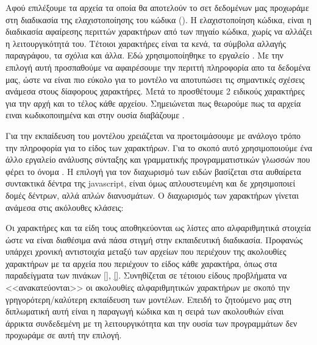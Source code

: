 Αφού επιλέξουμε τα αρχεία τα οποία θα αποτελούν το σετ δεδομένων μας προχωράμε στη διαδικασία της ελαχιστοποίησης του κώδικα ().
Η ελαχιστοποίηση κώδικα, είναι η διαδικασία αφαίρεσης περιττών χαρακτήρων από των πηγαίο κώδικα, χωρίς να αλλάζει η λειτουργικότητά του. Τέτοιοι χαρακτήρες είναι τα κενά, τα σύμβολα αλλαγής παραγράφου, τα σχόλια και άλλα. Εδώ χρησιμοποίηθηκε το εργαλείο .
Με την επιλογή αυτή προσπαθούμε να αφαιρέσουμε την περιττή πληροφορία απο τα δεδομένα μας, ώστε να είναι πιο εύκολο για το μοντέλο να αποτυπώσει τις σημαντικές σχέσεις ανάμεσα στους δίαφορους χαρακτήρες.
Μετά το  προσθέτουμε 2 ειδικούς χαρακτήρες για την αρχή και το τέλος κάθε αρχείου. Σημειώνεται πως θεωρούμε πως τα αρχεία ειναι  κωδικοποιημένα και στην ουσία διαβάζουμε . 

Για την εκπαίδευση του μοντέλου  χρειάζεται να προετοιμάσουμε με ανάλογο τρόπο την πληροφορία για το είδος των χαρακτήρων. Για το σκοπό αυτό χρησιμοποιούμε ένα άλλο εργαλείο ανάλυσης σύνταξης και γραμματικής προγραμματιστικών γλωσσών που φέρει το όνομα .
Η επιλογή για τον διαχωρισμό των ειδών βασίζεται στα αυθαίρετα συντακτικά δέντρα  της javascript, είναι όμως απλουστευμένη και δε χρησιμοποιεί δομές δέντρων, αλλά απλών διανυσμάτων.
Ο διαχωρισμός των χαρακτήρων γίνεται ανάμεσα στις ακόλουθες κλάσεις: 

Οι χαρακτήρες και τα είδη τους αποθηκεύονται ως λίστες απο αλφαριθμητικά στοιχεία ώστε να είναι διαθέσιμα ανά πάσα στιγμή στην εκπαιδευτική διαδικασία.
Προφανώς υπάρχει χρονική αντιστοιχία μεταξύ των αρχείων που περιέχουν της ακολουθίες χαρακτήρων με τα αρχεία που περιέχουν το είδος κάθε χαρακτήρα, όπως στα παραδείγματα των πινάκων \ref{}, \ref{}. %
Συνηθίζεται σε τέτοιου είδους προβλήματα να <<ανακατεύονται>> οι ακολουθίες αλφαριθμητικών χαρακτήρων με σκοπό την γρηγορότερη/καλύτερη εκπαίδευση των μοντέλων.
Επειδή το ζητούμενο μας στη διπλωματική αυτή είναι η παραγωγή κώδικα και η σειρά των ακολουθιών είναι άρρικτα συνδεδεμένη με τη λειτουργικότητα και την ουσία των προγραμμάτων δεν προχωράμε σε αυτή την επιλογή.  

